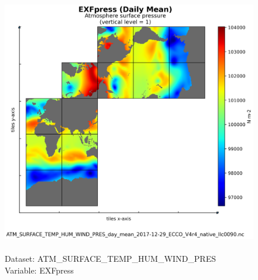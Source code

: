 \begin{figure}[H]
\centering
\includegraphics[scale=0.5]{../images/plots/native_plots/Atmosphere_Surface_Temperature_Humidity_Wind_and_Pressure/EXFpress.png}
\caption{\\Dataset: ATM\_SURFACE\_TEMP\_HUM\_WIND\_PRES\\Variable: EXFpress}
\label{tab:table-ATM_SURFACE_TEMP_HUM_WIND_PRES_EXFpress-Plot}
\end{figure}
\pagebreak
